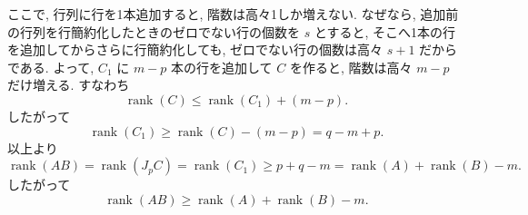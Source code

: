 \documentclass[uplatex,dvipdfmx,a4paper,14pt]{jsarticle}
\newcommand{\rank}{\operatorname{rank}}
\begin{document}
ここで, 行列に行を1本追加すると, 階数は高々1しか増えない. なぜなら, 追加前の行列を行簡約化したときのゼロでない行の個数を $s$ とすると, そこへ1本の行を追加してからさらに行簡約化しても, ゼロでない行の個数は高々 $s+1$ だからである. よって, $C_1$ に $m-p$ 本の行を追加して $C$ を作ると, 階数は高々 $m-p$ だけ増える. すなわち
\[
\rank(C)\le \rank(C_1)+(m-p).
\]
したがって
\[
\rank(C_1)
\ge
\rank(C)-(m-p)
= q-m+p.
\]
以上より
\[
\rank(AB)=\rank(J_pC)=\rank(C_1)
\ge p+q-m
=\rank(A)+\rank(B)-m.
\]
したがって
\[
\boxed{\rank(AB)\ge \rank(A)+\rank(B)-m.}
\]
\end{document}
